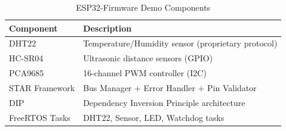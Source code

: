 \begin{table}[H]
\centering
\caption{ESP32-Firmware Demo Components}
\label{tab:demo-components}
\begin{tabular}{@{}ll@{}}
\toprule
\textbf{Component} & \textbf{Description} \\
\midrule
DHT22 & Temperature/Humidity sensor (proprietary protocol) \\
HC-SR04 & Ultrasonic distance sensors (GPIO) \\
PCA9685 & 16-channel PWM controller (I2C) \\
STAR Framework & Bus Manager + Error Handler + Pin Validator \\
DIP & Dependency Inversion Principle architecture \\
FreeRTOS Tasks & DHT22, Sensor, LED, Watchdog tasks \\
\bottomrule
\end{tabular}
\end{table}
